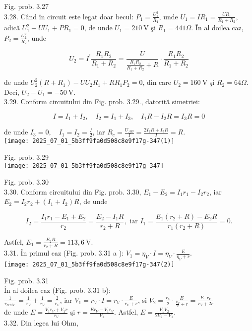 Fig. prob. 3.27\\
3.28. Când în circuit este legat doar becul: $P_{1}=\frac{U_{1}^{2}}{R_{1}}$, unde $U_{1}=I R_{1}=\frac{U R_{1}}{R_{1}+R_{2}}$, adică $U_{1}^{2}-U U_{1}+P R_{1}=0$, de unde $U_{1}=210 \mathrm{~V}$ şi $R_{1}=441 \Omega$. În al doilea caz, $P_{2}=\frac{U_{2}^{2}}{R_{2}}$, unde

$$
U_{2}=I^{\prime} \frac{R_{1} R_{2}}{R_{1}+R_{2}}=\frac{U}{\frac{R_{1} R_{2}}{R_{1}+R_{2}}+R} \cdot \frac{R_{1} R_{2}}{R_{1}+R_{2}}
$$

de unde $U_{2}^{2}\left(R+R_{1}\right)-U U_{2} R_{1}+R R_{1} P_{2}=0$, din care $U_{2}=160 \mathrm{~V}$ şi $R_{2}=64 \Omega$. Deci, $U_{2}-U_{1}=-50 \mathrm{~V}$.\\
3.29. Conform circuitului din Fig. prob. 3.29., datorită simetriei:

$$
I=I_{1}+I_{2}, \quad I_{2}=I_{1}+I_{3}, \quad I_{1} R-I_{2} R=I_{3} R=0
$$

de unde $I_{3}=0, \quad I_{1}=I_{2}=\frac{I}{2}$, iar $R_{e}=\frac{U_{A B}}{I}=\frac{2 I_{2} R+I_{3} R}{I}=R$.\\
\texttt{[image: 2025\_07\_01\_5b3ff9fa0d508c8e9f17g-347(1)]}

Fig. prob. 3.29\\
\texttt{[image: 2025\_07\_01\_5b3ff9fa0d508c8e9f17g-347]}

Fig. prob. 3.30\\
3.30. Conform circuitului din Fig. prob. 3.30, $E_{1}-E_{2}=I_{1} r_{1}-I_{2} r_{2}$, iar $E_{2}=I_{2} r_{2}+\left(I_{1}+I_{2}\right) R$, de unde

$$
I_{2}=\frac{I_{1} r_{1}-E_{1}+E_{2}}{r_{2}}=\frac{E_{2}-I_{1} R}{r_{2}+R}, \text { iar } I_{1}=\frac{E_{1}\left(r_{2}+R\right)-E_{2} R}{r_{1}\left(r_{2}+R\right)}=0 .
$$

Astfel, $E_{1}=\frac{E_{2} R}{r_{2}+R}=113,6 \mathrm{~V}$.\\
3.31. În primul caz (Fig. prob. 3.31 a ): $V_{1}=\eta_{V} \cdot I=\eta_{V} \cdot \frac{E}{\eta_{V}+r}$.\\
\texttt{[image: 2025\_07\_01\_5b3ff9fa0d508c8e9f17g-347(2)]}

Fig. prob. 3.31\\
În al doilea caz (Fig. prob. 3.31 b):\\
$\frac{1}{r_{\text {echiv }}}=\frac{1}{r_{V}}+\frac{1}{r_{V}}=\frac{2}{r_{V}}$, iar $V_{1}=r_{V} \cdot I=r_{V} \cdot \frac{E}{r_{V}+r}$, si $V_{2}=\frac{r_{V}}{2} \cdot \frac{E}{\frac{r_{V}}{2}+r}=\frac{E \cdot r_{V}}{r_{V}+2 r}$\\
de unde $E=\frac{V_{1} r_{V}+V_{1} r}{r_{V}}$ şi $r=\frac{E r_{V}-V_{1} r_{V}}{V_{1}}$. Astfel, $E=\frac{V_{1} V_{2}}{2 V_{2}-V_{1}}$.\\
3.32. Din legea lui Ohm,


